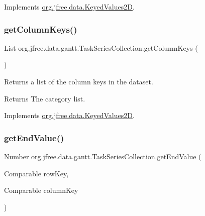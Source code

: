 Implements \mbox{\hyperlink{interfaceorg_1_1jfree_1_1data_1_1_keyed_values2_d_a9ced6cbaf04f048db059e1ebf5184d2a}{org.\+jfree.\+data.\+Keyed\+Values2D}}.

\mbox{\label{classorg_1_1jfree_1_1data_1_1gantt_1_1_task_series_collection_a7d5753768700a7a2e33f6e2918aa6ecd}} 
\subsubsection{\texorpdfstring{get\+Column\+Keys()}{getColumnKeys()}}
{\footnotesize\ttfamily List org.\+jfree.\+data.\+gantt.\+Task\+Series\+Collection.\+get\+Column\+Keys (\begin{DoxyParamCaption}{ }\end{DoxyParamCaption})}

Returns a list of the column keys in the dataset.

\begin{DoxyReturn}{Returns}
The category list. 
\end{DoxyReturn}


Implements \mbox{\hyperlink{interfaceorg_1_1jfree_1_1data_1_1_keyed_values2_d_af6b8780fee7cccdb967fc0f199398615}{org.\+jfree.\+data.\+Keyed\+Values2D}}.

\mbox{\label{classorg_1_1jfree_1_1data_1_1gantt_1_1_task_series_collection_a93e90606e5261c2fa4ba8a1026f78a1e}} 
\subsubsection{\texorpdfstring{get\+End\+Value()}{getEndValue()}\hspace{0.1cm}{\footnotesize\ttfamily [1/4]}}
{\footnotesize\ttfamily Number org.\+jfree.\+data.\+gantt.\+Task\+Series\+Collection.\+get\+End\+Value (\begin{DoxyParamCaption}\item[{Comparable}]{row\+Key,  }\item[{Comparable}]{column\+Key }\end{DoxyParamCaption})}

